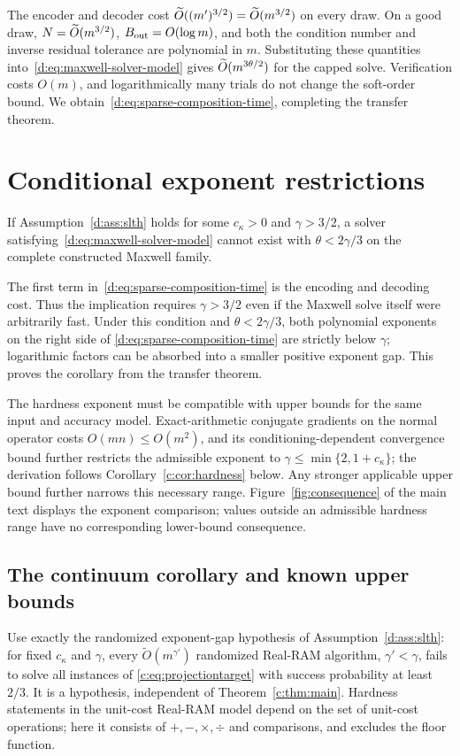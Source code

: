 The encoder and decoder cost $\widetilde O((m')^{3/2})=\widetilde O(m^{3/2})$ on every
draw. On a good draw,
$N=\widetilde O(m^{3/2})$, $B_{\rm out}=O(\log m)$, and both the condition number and
inverse residual tolerance are polynomial in $m$. Substituting these
quantities into~\eqref{d:eq:maxwell-solver-model} gives
$\widetilde O(m^{3\theta/2})$ for the capped solve. Verification costs
$O(m)$, and logarithmically many trials do not change the soft-order
bound. We obtain~\eqref{d:eq:sparse-composition-time}, completing the
transfer theorem.

\section{Conditional exponent restrictions}\label{si:sec:hardness}

\begin{corollary}
\label{d:cor:complexity}
If Assumption~\ref{d:ass:slth} holds for some $c_\kappa>0$ and
$\gamma>3/2$, a solver satisfying~\eqref{d:eq:maxwell-solver-model} cannot
exist with $\theta<2\gamma/3$ on the complete constructed Maxwell family.
\end{corollary}

The first term in~\eqref{d:eq:sparse-composition-time} is the encoding and
decoding cost. Thus the implication requires $\gamma>3/2$ even if the
Maxwell solve itself were arbitrarily fast. Under this condition and
$\theta<2\gamma/3$, both polynomial exponents on the right side of
\eqref{d:eq:sparse-composition-time} are strictly below $\gamma$;
logarithmic factors can be absorbed into a smaller positive exponent
gap. This proves the corollary from the transfer theorem.

The hardness exponent must be compatible with upper bounds for the same
input and accuracy model. Exact-arithmetic conjugate gradients on the
normal operator costs $O(mn)\le O(m^2)$, and its conditioning-dependent
convergence bound further restricts the admissible exponent to
$\gamma\le\min\{2,1+c_\kappa\}$; the derivation follows
Corollary~\ref{c:cor:hardness} below. Any stronger applicable upper bound further narrows this
necessary range. Figure~\ref{fig:consequence} of the main text displays the exponent
comparison; values outside an admissible hardness range have no
corresponding lower-bound consequence.



\subsection{The continuum corollary and known upper bounds}
Use exactly the randomized exponent-gap hypothesis of
Assumption~\ref{d:ass:slth}: for fixed $c_\kappa$ and $\gamma$, every
$\widetilde O(m^{\gamma'})$ randomized Real-RAM algorithm,
$\gamma'<\gamma$, fails to solve all instances of
\eqref{c:eq:projectiontarget} with success probability at least $2/3$.
It is a hypothesis, independent of Theorem~\ref{c:thm:main}. Hardness
statements in the unit-cost Real-RAM model depend on the set of unit-cost
operations; here it consists of $+,-,\times,\div$ and comparisons, and
excludes the floor function.

